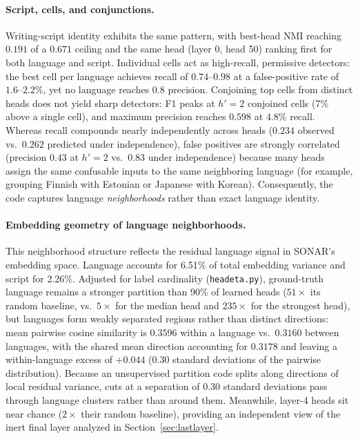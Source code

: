 \paragraph{Script, cells, and conjunctions.} Writing-script identity
exhibits the same pattern, with best-head NMI reaching $0.191$ of a
$0.671$ ceiling and the same head (layer 0, head 50) ranking first for
both language and script. Individual cells act as high-recall,
permissive detectors: the best cell per language achieves recall of
$0.74$--$0.98$ at a false-positive rate of $1.6$--$2.2\%$, yet no
language reaches $0.8$ precision. Conjoining top cells from distinct
heads does not yield sharp detectors: F1 peaks at $h'{=}2$ conjoined
cells (7\% above a single cell), and maximum precision reaches $0.598$ at
$4.8\%$ recall. Whereas recall compounds nearly independently across heads
($0.234$ observed vs.\ $0.262$ predicted under independence), false
positives are strongly correlated (precision $0.43$ at $h'{=}2$ vs.\
$0.83$ under independence) because many heads assign the same confusable
inputs to the same neighboring language (for example, grouping Finnish
with Estonian or Japanese with Korean). Consequently, the code captures
language \emph{neighborhoods} rather than exact language identity.

\paragraph{Embedding geometry of language neighborhoods.} This
neighborhood structure reflects the residual language signal in SONAR's
embedding space. Language accounts for 6.51\% of total embedding variance
and script for 2.26\%. Adjusted for label cardinality (\texttt{headeta.py}),
ground-truth language remains a stronger partition than 90\% of learned
heads ($51\times$ its random baseline, vs.\ $5\times$ for the median head
and $235\times$ for the strongest head), but languages form weakly
separated regions rather than distinct directions: mean pairwise cosine
similarity is $0.3596$ within a language vs.\ $0.3160$ between languages,
with the shared mean direction accounting for $0.3178$ and leaving a
within-language excess of $+0.044$ ($0.30$ standard deviations of the
pairwise distribution). Because an unsupervised partition code splits
along directions of local residual variance, cuts at a separation of
$0.30$ standard deviations pass through language clusters rather than
around them. Meanwhile, layer-4 heads sit near chance ($2\times$ their
random baseline), providing an independent view of the inert final layer
analyzed in Section~\ref{sec:lastlayer}.


